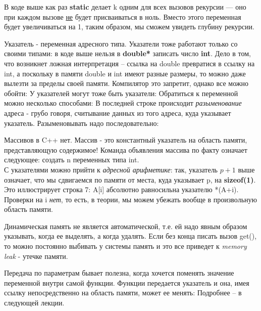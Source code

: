 \begin{lecture}[\lectureSubject]
\begin{lecSection}
		В коде выше как раз \textbf{static} делает k одним для всех вызовов рекурсии --- оно при каждом вызове \underline{не} будет присваиваться в ноль. Вместо этого переменная будет увеличиваться на 1, таким образом, мы сможем увидеть глубину рекурсии.
	\end{lecSection}
	\begin{lecSection}[Указатель]
		Указатель - переменная адресного типа.
		Указатели тоже работают только со своими типами: в коде выше нельзя в \textbf{double*} записать число \textbf{int}. Дело в том, что возникнет ложная интерпретация -- ссылка на double превратися в ссылку на int, а поскольку в памяти double и int имеют разные размеры, то можно даже вылезти за пределы своей памяти. Компилятор это запретит, однако все можно обойти:
		У указателей могут тоже быть указатели:
		Обратиться к переменной можно несколько способами:
		В последней строке происходит \textit{разыменование} адреса - грубо говоря, считывание данных из того адреса, куда указывает указатель. Разыменовывать надо последовательно:
	\end{lecSection}
	\begin{lecSection}
		Массивов в C++ нет. Массив - это константный указатель на область памяти, представляющую содержимое!
		Команда объявления массива по факту означает следующее: создать n переменных типа int. \\
		С указателями можно прийти к \textit{адресной арифметике}: так, указатель $p+1$ выше означает, что мы сдвигаемся по памяти от места, куда указывает p, на \textbf{sizeof(1)}. Это иллюстрирует строка 7: A[i] абсолютно равносильна указателю *(A+i). Проверки на i \textit{нет}, то есть, в теории, мы можем убежать вообще в произвольную область памяти.
	\end{lecSection}
	\begin{lecSection}
		Динамическая память не является автоматической, т.е. ей надо явным образом указывать, когда ее выделять, а когда удалять. Если без конца писать вызов get(), то можно постоянно выбивать у системы память и это все приведет к \textit{memory leak} - утечке памяти.
	\end{lecSection}
	\begin{lecSection}
		Передача по параметрам бывает полезна, когда хочется поменять значение переменной внутри самой функции. Функции передается указатель и она, имея ссылку непосредственно на область памяти, может ее менять:
		Подробнее -- в следующей лекции.
	\end{lecSection}
\end{lecture}

